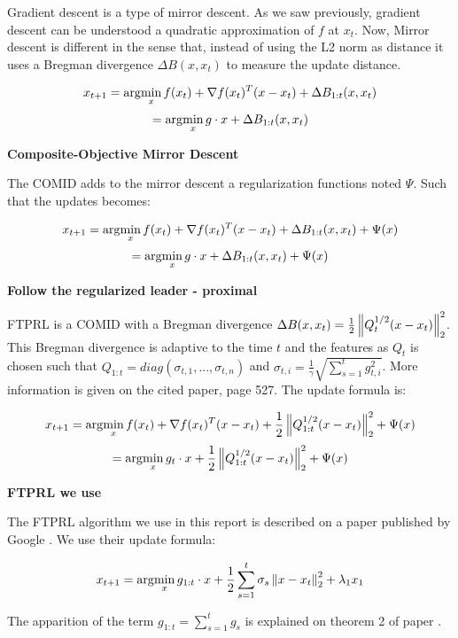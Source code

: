 		Gradient descent is a type of mirror descent. As we saw previously, gradient descent can be understood a quadratic approximation of $f$ at $x_t$. Now, Mirror descent is different in the sense that, instead of using the L2 norm as distance it uses a Bregman divergence $\Delta B(x,x_t)$ to measure the update distance.

		$$ x_{t+1} = \arg\!\min_x f(x_t)+\nabla f(x_t)^T(x-x_t) + \Delta B_{1:t}(x,x_t)  $$
		$$  = \arg\!\min_x g\cdot x + \Delta B_{1:t}(x,x_t)  $$

		\vspace{\baselineskip}
		\textbf{Composite-Objective Mirror Descent \cite{mcmahan2011follow}}

		The COMID adds to the mirror descent a regularization functions noted $\Psi$. Such that the updates becomes:

		$$ x_{t+1} = \arg\!\min_x f(x_t)+\nabla f(x_t)^T(x-x_t) + \Delta B_{1:t}(x,x_t) + \Psi(x) $$
		$$ = \arg\!\min_x g\cdot x + \Delta B_{1:t}(x,x_t) + \Psi(x) $$

		\vspace{\baselineskip}
		\textbf{Follow the regularized leader - proximal \cite{mcmahan2011follow}}

		FTPRL is a COMID with a Bregman divergence $\Delta B(x,x_t) = \frac{1}{2}\left\lVert Q_t^{1/2}(x-x_t)\right\rVert_2^2$. This Bregman divergence is adaptive to the time $t$ and the features as $Q_t$ is chosen such that $Q_{1:t} = diag(\sigma_{t,1},...,\sigma_{t,n})$ and $\sigma_{t,i} = \frac{1}{\gamma}\sqrt{\sum_{s=1}^t g_{t,i}^2}$. More information is given on the cited paper, page 527. The update formula is:

		$$ x_{t+1} = \arg\!\min_x f(x_t)+\nabla f(x_t)^T(x-x_t) + \frac{1}{2}\left\lVert Q_{1:t}^{1/2}(x-x_t)\right\rVert_2^2 + \Psi(x) $$
		$$ = \arg\!\min_x g_t\cdot x + \frac{1}{2}\left\lVert Q_{1:t}^{1/2}(x-x_t)\right\rVert_2^2 + \Psi(x)$$


		\vspace{\baselineskip}
		\textbf{FTPRL we use \cite{mcmahan2013ad}}

		The FTPRL algorithm we use in this report is described on a paper published by Google \cite{mcmahan2013ad}. We use their update formula:
		
		\begin{equation}
			x_{t+1} = \arg\!\min_x g_{1:t}\cdot x + \frac{1}{2}\sum_{s=1}^t{\sigma_s \left\lVert x-x_t\right\rVert_2^2 + \lambda_1 x_1}
			\label{eq:FTPRL}
		\end{equation}

		The apparition of the term $g_{1:t} = \sum_{s=1}^t g_s$ is explained on theorem 2 of paper \cite{mcmahan2011follow}.




